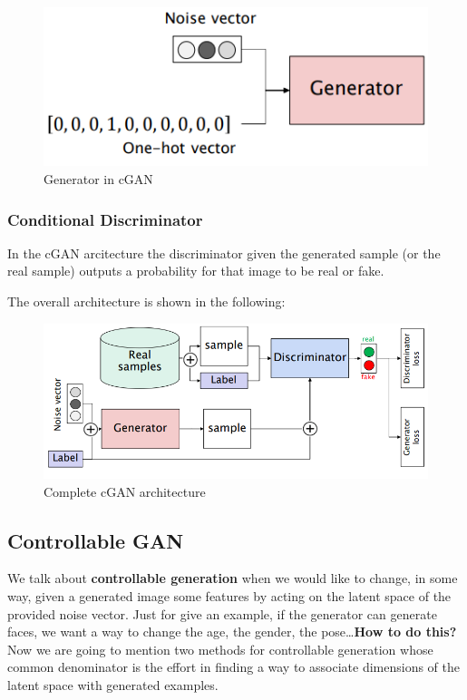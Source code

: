 \begin{figure}[h]
    \centering
    \includegraphics[scale=0.8]{img/condGen.png}
    \caption{Generator in cGAN}
\end{figure}

\subsubsection{Conditional Discriminator}
In the cGAN arcitecture the discriminator given the generated sample (or the real sample) outputs a probability for that image to be real or fake.

The overall architecture is shown in the following:

\begin{figure}
    \centering
    \includegraphics[scale=0.8]{img/cGAN.png}
    \caption{Complete cGAN architecture}
\end{figure}

\subsection{Controllable GAN}
We talk about \textbf{controllable generation} when we would like to change, in some way, given a generated image some features by acting on the latent space of the provided noise vector. Just for give an example, if the generator can generate faces, we want a way to change the age, the gender, the pose\dots \textbf{How to do this?} Now we are going to mention two methods for controllable generation whose common denominator is the effort in finding a way to associate dimensions of the latent space with generated examples.

